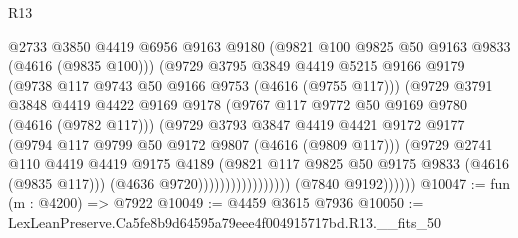 \begin{lexlean}{R13}
\begin{coremodule}
                                      @2733
                                      @3850
                                      @4419
                                      @6956
                                      @9163
                                      @9180
                                      (@9821 @100 @9825 @50 @9163 @9833 (@4616 (@9835 @100)))
                                      (@9729
                                        @3795
                                        @3849
                                        @4419
                                        @5215
                                        @9166
                                        @9179
                                        (@9738 @117 @9743 @50 @9166 @9753 (@4616 (@9755 @117)))
                                        (@9729
                                          @3791
                                          @3848
                                          @4419
                                          @4422
                                          @9169
                                          @9178
                                          (@9767 @117 @9772 @50 @9169 @9780 (@4616 (@9782 @117)))
                                          (@9729
                                            @3793
                                            @3847
                                            @4419
                                            @4421
                                            @9172
                                            @9177
                                            (@9794 @117 @9799 @50 @9172 @9807 (@4616 (@9809 @117)))
                                            (@9729
                                              @2741
                                              @110
                                              @4419
                                              @4419
                                              @9175
                                              @4189
                                              (@9821
                                                @117
                                                @9825
                                                @50
                                                @9175
                                                @9833
                                                (@4616 (@9835 @117)))
                                              (@4636 @9720)))))))))))))))))
              (@7840 @9192))))))
@10047 := fun (m : @4200) => @7922
@10049 := @4459 @3615 @7936
@10050 := LexLeanPreserve.Ca5fe8b9d64595a79eee4f004915717bd.R13.__fits_50

\end{coremodule}
\end{lexlean}
